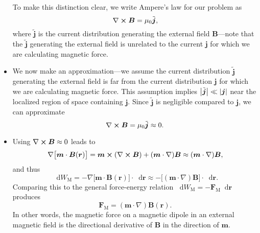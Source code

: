 \documentclass[11pt, a4paper]{article}
\newcommand{\diff}{\mathop{}\!\mathrm{d}} %
\renewcommand{\vec}[1]{\bm{#1}} %
\renewcommand{\t}[1]{\tilde{#1}} %
\renewcommand{\r}{\vec{r}}
\newcommand{\B}{\vec{B}} %
\newcommand{\mm}{\mu_{0}}  %
\newcommand{\m}{\vec{m}}  %
\renewcommand{\j}{\vec{j}}  %
\renewcommand{\curl}{\nabla \cross}
\renewcommand{\grad}{\nabla}
\begin{document}
\begin{itemize}
	To make this distinction clear, we write Ampere's law for our problem as 
	\begin{equation*}
		\curl \B = \mm \t{\j},
	\end{equation*}
	where $ \t{\j} $ is the current distribution generating the external field $ \B $---note that the $ \t{\j} $ generating the external field is unrelated to the current $ \j $ for which we are calculating magnetic force.
	
	\item We now make an approximation---we assume the current distribution $ \t{\j} $ generating the external field is far from the current distribution $ \j $ for which we are calculating magnetic force. This assumption implies $ \big |\t{\j}\big | \ll \abs{\j} $ near the localized region of space containing $ \j $. Since $ \t{\j} $ is negligible compared to $ \j $, we can approximate
	\begin{equation*}
		\curl \B = \mm \t{\j} \approx 0.
	\end{equation*}

	\item Using $ \curl \B \approx 0 $ leads to
	\begin{equation*}
		\grad\big[\m \cdot \B(\r)\big] = \m \cross (\curl \B) + (\m \cdot \grad)\B \approx (\m \cdot \grad)\B,
	\end{equation*}
	and thus
	\begin{equation*}
		\diff W_{\text{M}} = - \grad\big[\m \cdot \B(\r)\big]\cdot  \diff \r \approx - \big[ (\m \cdot \grad)\B\big]\cdot \diff \r.
	\end{equation*}
	Comparing this to the general force-energy relation $ \diff W_{\text{M}} = - \vec{F}_{\text{M}}\diff \r $ produces
	\begin{equation*}
		\vec{F}_{\text{M}} = (\m \cdot \grad)\B(\r).
	\end{equation*}
	In other words, the magnetic force on a magnetic dipole in an external magnetic field is the directional derivative of $ \B $ in the direction of $ \m $.
\end{itemize}
\end{document}
